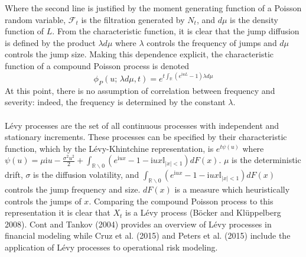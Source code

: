 \documentclass{article}
\theoremstyle{definition}
\begin{document}
Where the second line is justified by the moment generating function of a Poisson random variable, \(\mathcal{F}_t\) is the filtration generated by \(N_t\), and \(d\mu\) is the density function of \(L\).  From the characteristic function, it is clear that the jump diffusion is defined by the product \(\lambda d\mu\) where \(\lambda\) controls the frequency of jumps and \(d\mu\) controls the jump size. Making this dependence explicit, the characteristic function of a compound Poisson process is denoted
\begin{equation}\phi_P (u;\,\lambda d\mu, t)=e^{t \int_{\mathbb{R}} (e^{\mathrm{i}uL}-1) \lambda d\mu}\end{equation}
At this point, there is no assumption of correlation between frequency and severity: indeed, the frequency is determined by the constant \(\lambda\).  
\\
\\

L\'evy processes are the set of all continuous processes with independent and stationary increments.  These processes can be specified by their characteristic function, which by the L\'evy-Khintchine representation, is \(e^{t\psi(u)}\) where \(\psi(u)=\mu \mathrm{i} u -\frac{\sigma^2 u^2}{2}+\int_{\mathbb{R}\backslash 0} \left(e^{\mathrm{i} u x}-1-\mathrm{i}ux\mathbb{I}_{|x|<1}\right)dF(x)\). \(\mu\) is the deterministic drift, \(\sigma\) is the diffusion volatility, and \(\int_{\mathbb{R}\backslash 0} \left(e^{\mathrm{i} u x}-1-\mathrm{i}ux\mathbb{I}_{|x|<1}\right)dF(x)\) controls the jump frequency and size.  \(dF(x)\) is a measure which heuristically controls the jumps of \(x\).  Comparing the compound Poisson process to this representation it is clear that \(X_t\) is a L\'evy process (B\"ocker and Kl\"uppelberg 2008).  Cont and Tankov (2004) provides an overview of L\'evy processes in financial modeling while Cruz et al. (2015) and Peters et al. (2015) include the application of L\'evy processes to operational risk modeling.
\end{document}

